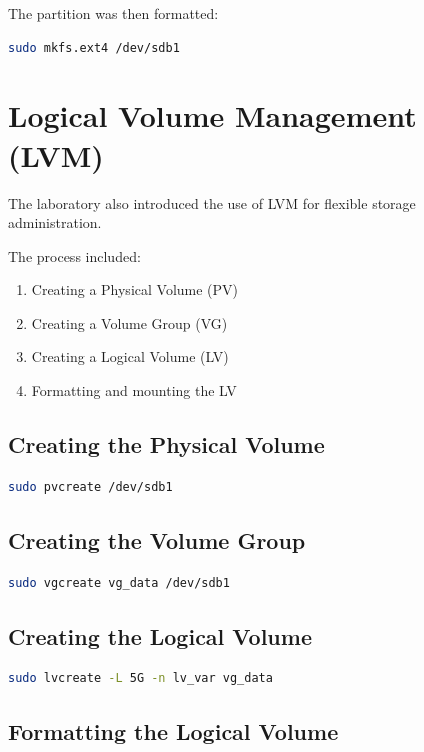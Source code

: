 \documentclass[11pt,a4paper]{article}
\begin{document}
The partition was then formatted:

\begin{lstlisting}[language=bash]
sudo mkfs.ext4 /dev/sdb1
\end{lstlisting}

\section{Logical Volume Management (LVM)}

The laboratory also introduced the use of LVM for flexible storage administration.

The process included:
\begin{enumerate}
    \item Creating a Physical Volume (PV)
    \item Creating a Volume Group (VG)
    \item Creating a Logical Volume (LV)
    \item Formatting and mounting the LV
\end{enumerate}

\subsection{Creating the Physical Volume}

\begin{lstlisting}[language=bash]
sudo pvcreate /dev/sdb1
\end{lstlisting}

\subsection{Creating the Volume Group}

\begin{lstlisting}[language=bash]
sudo vgcreate vg_data /dev/sdb1
\end{lstlisting}

\subsection{Creating the Logical Volume}

\begin{lstlisting}[language=bash]
sudo lvcreate -L 5G -n lv_var vg_data
\end{lstlisting}

\subsection{Formatting the Logical Volume}
\end{document}
